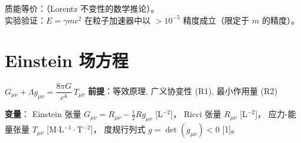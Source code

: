 \precisionbox[精度等级]
  质能等价：\precexact（Lorentz 不变性的数学推论）。\\
  实验验证：$E = \gamma mc^2$ 在粒子加速器中以 $>10^{-5}$ 精度成立（限定于 $m$ 的精度）。
\endprecisionbox

\section{Einstein 场方程}

\begin{lawbox}
  $G_{\mu\nu} + \Lambda g_{\mu\nu} = \dfrac{8\pi G}{c^4}\,T_{\mu\nu}$
  \quad\textbf{前提}：等效原理, 广义协变性 (R1), 最小作用量 (R2)
\end{lawbox}

\noindent\textbf{变量}：
Einstein 张量 $G_{\mu\nu} = R_{\mu\nu} - \frac{1}{2}Rg_{\mu\nu}$ [L$^{-2}$]，
Ricci 张量 $R_{\mu\nu}$ [L$^{-2}$]，
应力-能量张量 $T_{\mu\nu}$ [M$\cdot$L$^{-1}\cdot$T$^{-2}$]，
度规行列式 $g = \det(g_{\mu\nu}) < 0$ [1]。

